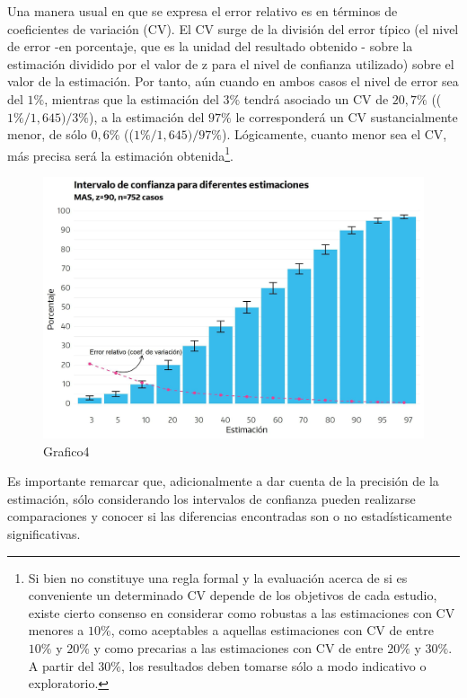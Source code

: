 \documentclass[
]{book}
\begin{document}
Una manera usual en que se expresa el error relativo es en términos de coeficientes de variación (CV). El CV surge de la división del error típico (el nivel de error -en porcentaje, que es la unidad del resultado obtenido - sobre la estimación dividido por el valor de z para el nivel de confianza utilizado) sobre el valor de la estimación. Por tanto, aún cuando en ambos casos el nivel de error sea del \(1\%\), mientras que la estimación del \(3\%\) tendrá asociado un CV de \(20,7\%\) ((\(1\%/1,645)/3\%\)), a la estimación del \(97\%\) le corresponderá un CV sustancialmente menor, de sólo \(0,6\%\) ((\(1\%/1,645)/97\%\)). Lógicamente, cuanto menor sea el CV, más precisa será la estimación obtenida\footnote{Si bien no constituye una regla formal y la evaluación acerca de si es conveniente un determinado CV depende de los objetivos de cada estudio, existe cierto consenso en considerar como robustas a las estimaciones con CV menores a \(10\%\), como aceptables a aquellas estimaciones con CV de entre \(10\%\) y \(20\%\) y como precarias a las estimaciones con CV de entre \(20\%\) y \(30\%\). A partir del \(30\%\), los resultados deben tomarse sólo a modo indicativo o exploratorio.}.

\begin{figure}
\includegraphics[width=1\linewidth]{imagenes/DT4_grafico4} \caption{Grafico4}\label{fig:Intervalodeconfianza}
\end{figure}

Es importante remarcar que, adicionalmente a dar cuenta de la precisión de la estimación, sólo considerando los intervalos de confianza pueden realizarse comparaciones y conocer si las diferencias encontradas son o no estadísticamente significativas.
\end{document}
